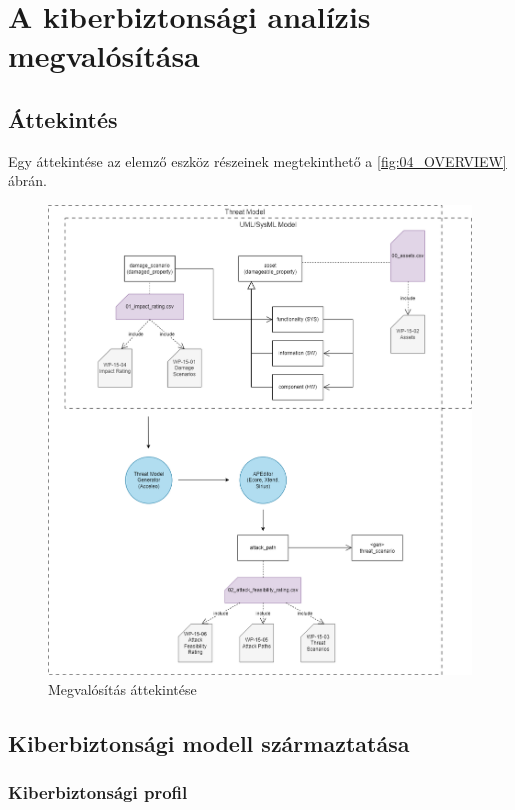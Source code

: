 \chapter{A kiberbiztonsági analízis megvalósítása}
\section{Áttekintés}

Egy áttekintése az elemző eszköz részeinek megtekinthető a \ref{fig:04_OVERVIEW} ábrán.

\begin{figure}[!ht]
	\centering
	\includegraphics[width=130mm, keepaspectratio]{figures/05_overview.png}
	\caption{Megvalósítás áttekintése}
	\label{fig:05_OVERVIEW}
\end{figure}

\section{Kiberbiztonsági modell származtatása}

\subsection{Kiberbiztonsági profil}

